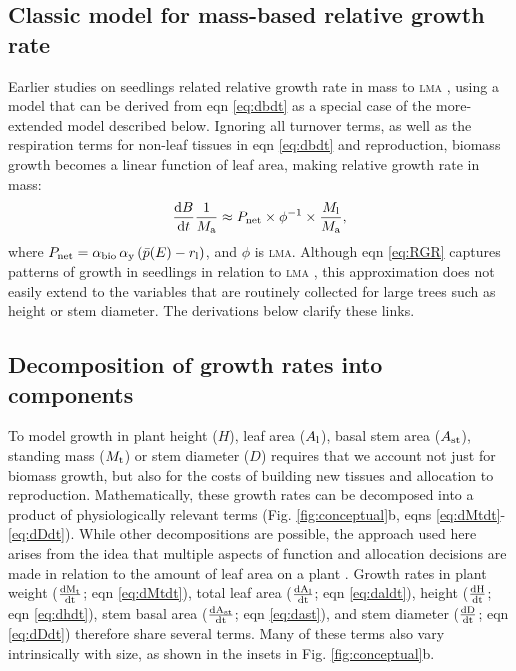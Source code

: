 \documentclass[9pt,twocolumn,twoside,lineno]{pnas-new}
\newcommand{\ud}{\ensuremath{\rm{d}}}
\newcommand{\lma}{\textsc{lma}}
\begin{document}
\subsection*{Classic model for mass-based relative growth rate}

Earlier studies on seedlings related relative growth rate in mass to {\lma} \citep{Blackman-1919, Lambers-1992, Cornelissen-1996, Wright-2000}, using a model that can be derived from eqn \ref{eq:dbdt} as a special case of the more-extended model described below. Ignoring all turnover terms, as well as the respiration terms for non-leaf tissues in eqn \ref{eq:dbdt} and reproduction, biomass growth becomes a linear function of leaf area, making relative growth rate in mass:
\begin{equation}\label{eq:RGR}
\frac{{\rm d}B}{{\rm d}t}\frac{1}{M_{\rm a}}  \approx P_{\rm net} \times \phi^{-1} \times \frac{M_{\rm l}}{M_{\rm a}}, \end{equation}
where $P_{\rm net} = \alpha_{\rm bio} \, \alpha_{\rm y}\,(\bar{p}(E) - r_{\rm l})$, and $\phi$ is {\lma}. Although eqn \ref{eq:RGR} captures patterns of growth in seedlings in relation to {\lma} \citep{Wright-2000}, this approximation does not easily extend to the variables that are routinely collected for large trees such as height or stem diameter. The derivations below clarify these links.

\subsection*{Decomposition of growth rates into components}

\label{eq:dbdt_2}
\label{eq:dMtdt}
\label{eq:daldmt}
\label{eq:daldt}
\label{eq:dhdt}
\label{eq:dast}
\label{eq:dDdt}


To model growth in plant height ($H$), leaf area ($A_{\rm l}$), basal stem area ($ A_{\rm st}$), standing mass ($M_{\rm t}$) or stem diameter ($D$) requires that we account not just for biomass growth, but also for the costs of building new tissues and allocation to reproduction. Mathematically, these growth rates can be decomposed into a product of physiologically relevant terms \citep{Falster-2011, Gibert-2016} (Fig. \ref{fig:conceptual}b, eqns \ref{eq:dMtdt}-\ref{eq:dDdt}). While other decompositions are possible, the approach used here arises from the idea that multiple aspects of function and allocation decisions are made in relation to the amount of leaf area on a plant  \citep{Falster-2011}. Growth rates in plant weight ($\frac{\ud M_{\rm t} }{\ud t}$; eqn \ref{eq:dMtdt}), total leaf area ($\frac{\ud A_{\rm l}}{\ud t}$; eqn \ref{eq:daldt}), height ($\frac{\ud H}{\ud t}$; eqn \ref{eq:dhdt}), stem basal area ($\frac{\ud  A_{\rm st}}{\ud t}$; eqn \ref{eq:dast}), and stem diameter ($\frac{\ud D}{\ud t}$; eqn \ref{eq:dDdt}) therefore share several terms. Many of these terms also vary intrinsically with size, as shown in the insets in Fig. \ref{fig:conceptual}b.
\end{document}
